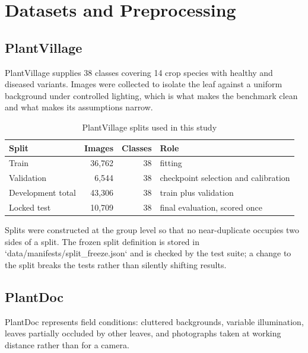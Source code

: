 
\chapter{Datasets and Preprocessing}
\label{ch:datasets}

\section{PlantVillage}

PlantVillage \cite{hughes2015} supplies 38 classes covering 14 crop species with
healthy and diseased variants. Images were collected to isolate the leaf against a
uniform background under controlled lighting, which is what makes the benchmark clean
and what makes its assumptions narrow.

\begin{table}[H]
\centering
\caption{PlantVillage splits used in this study}
\label{tab:pvsplits}
\tabfont
\begin{tabularx}{\textwidth}{@{}lrrY@{}}
\toprule
\textbf{Split} & \textbf{Images} & \textbf{Classes} & \textbf{Role} \\
\midrule
Train & 36,762 & 38 & fitting \\
Validation & 6,544 & 38 & checkpoint selection and calibration \\
Development total & 43,306 & 38 & train plus validation \\
Locked test & 10,709 & 38 & final evaluation, scored once \\
\bottomrule
\end{tabularx}
\end{table}

Splits were constructed at the group level so that no near-duplicate occupies two
sides of a split. The frozen split definition is stored in
`data/manifests/split\_freeze.json` and is checked by the test suite; a change to the
split breaks the tests rather than silently shifting results.

\section{PlantDoc}

PlantDoc \cite{singh2020} represents field conditions: cluttered backgrounds,
variable illumination, leaves partially occluded by other leaves, and photographs
taken at working distance rather than for a camera.

